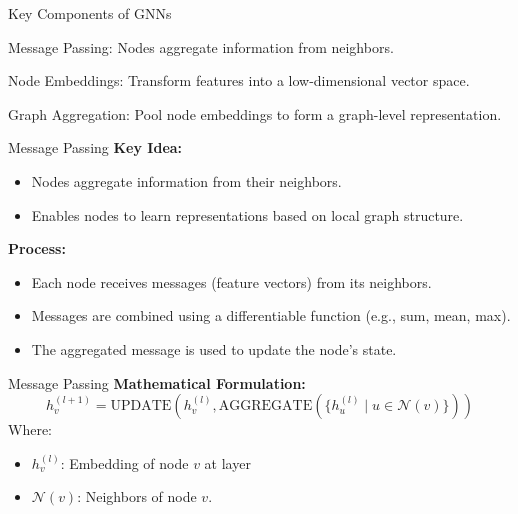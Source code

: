 \documentclass{beamer}
\begin{document}
\begin{frame}{Key Components of GNNs}
    \begin{block}{Message Passing:}
        Nodes aggregate information from neighbors.
    \end{block}

    \begin{block}{Node Embeddings:}
        Transform features into a low-dimensional vector space.
    \end{block}

    \begin{block}{Graph Aggregation:}
        Pool node embeddings to form a graph-level representation.
    \end{block}
    
\end{frame}
\begin{frame}{Message Passing}
    \textbf{Key Idea:}
    \begin{itemize}
        \item Nodes aggregate information from their neighbors.
        \item Enables nodes to learn representations based on local graph structure.
    \end{itemize}
    
    \vspace{0.5cm}
    
    \textbf{Process:}
    \begin{itemize}
        \item Each node receives messages (feature vectors) from its neighbors.
        \item Messages are combined using a differentiable function (e.g., sum, mean, max).
        \item The aggregated message is used to update the node's state.
    \end{itemize}
    
 \end{frame} 
 
 \begin{frame}{Message Passing}
    \textbf{Mathematical Formulation:}
    \[
    h_v^{(l+1)} = \text{UPDATE}\left(h_v^{(l)}, \text{AGGREGATE}\left(\{h_u^{(l)} \mid u \in \mathcal{N}(v)\}\right)\right)
    \]
    Where:
    \begin{itemize}
        \item \( h_v^{(l)} \): Embedding of node \( v \) at layer 
        \item \( \mathcal{N}(v) \): Neighbors of node \( v \).
    \end{itemize}
\end{frame}
\end{document}
